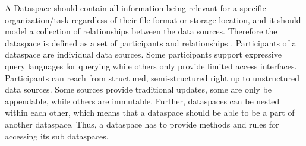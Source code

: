 



A Dataspace should contain all information being relevant for a specific organization/task regardless of their file format or storage location, and it should model a collection of relationships between the data sources. Therefore the dataspace is defined as a set of participants and relationships \cite[p. 29]{Franklin:2005:DDN:1107499.1107502}. Participants of a dataspace are individual data sources. Some participants support expressive query languages for querying while others only provide limited access interfaces. Participants can reach from structured, semi-structured right up to unstructured data sources. Some sources provide traditional updates, some are only be appendable, while others are immutable. Further, dataspaces can be nested within each other, which means that a dataspace should be able to be a part of another dataspace.  Thus, a dataspace has to provide methods and rules for accessing its sub dataspaces.

